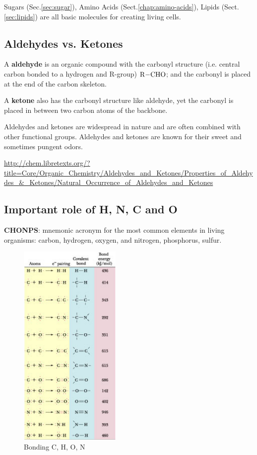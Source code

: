 \begin{framed}
  Sugars (Sec.\ref{sec:sugar}), Amino Acids (Sect.\ref{chap:amino-acids}),
  Lipids (Sect.\ref{sec:lipids}) are all basic molecules for creating living
  cells.
\end{framed}

\subsection{Aldehydes vs. Ketones}
\label{sec:aldehydes}
\label{sec:ketones}

A {\bf aldehyde} is an organic compound with the carbonyl structure (i.e.
central carbon bonded to a hydrogen and R-group) $\ce{R-CHO}$; and 
the carbonyl is placed at the end of the carbon skeleton.

A {\bf ketone} also has the carbonyl structure like aldehyde, yet the 
carbonyl is placed in  between two carbon atoms of the backbone.



Aldehydes and ketones are widespread in nature and are often combined with other
functional groups. Aldehydes and ketones are known for their sweet and sometimes
pungent odors.

\url{http://chem.libretexts.org/?title=Core/Organic_Chemistry/Aldehydes_and_Ketones/Properties_of_Aldehydes_&_Ketones/Natural_Occurrence_of_Aldehydes_and_Ketones}
\subsection{Important role of H, N, C and O}
\label{sec:important-role-h}

{\bf CHONPS}: mnemonic acronym for the most common elements in living
organisms: carbon, hydrogen, oxygen, and nitrogen, phosphorus, sulfur.

\begin{figure}[hbt]
  \centerline{\includegraphics[height=10cm,
    angle=0]{./images/bonding_C.H.O.N.eps}}
  \caption{Bonding C, H, O, N}
  \label{fig:bonding_chon}
\end{figure}


